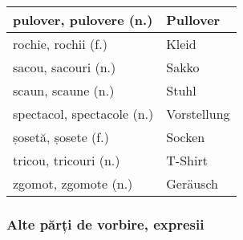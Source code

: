 \documentclass[11pt, oneside]{article}
\begin{document}
\begin{center}
\begin{tabular}{ | p{6cm}| p{6cm} | }
    \hline
    pulover, pulovere (n.) & Pullover\\
    \hline
    rochie, rochii (f.) & Kleid\\
    \hline
    sacou, sacouri (n.) & Sakko\\
    \hline
    scaun, scaune (n.) & Stuhl\\
    \hline
    spectacol, spectacole (n.) & Vorstellung\\
    \hline
    șosetă, șosete (f.) & Socken\\
    \hline
    tricou, tricouri (n.) & T-Shirt\\
    \hline
    zgomot, zgomote (n.) & Geräusch\\
    \hline
  \end{tabular}
\end{center}
%
%
\subsubsection*{Alte părți de vorbire, expresii}
\end{document}
